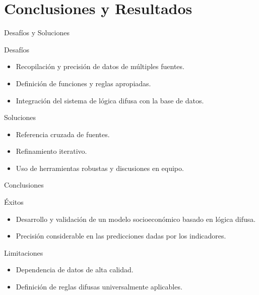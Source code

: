 \documentclass{beamer}
\begin{document}
\section{Conclusiones y Resultados}

\begin{frame}{Desafíos y Soluciones}
    \begin{block}{Desafíos}
        \begin{itemize}
            \item Recopilación y precisión de datos de múltiples fuentes.
            \item Definición de funciones y reglas apropiadas.
            \item Integración del sistema de lógica difusa con la base de datos.
        \end{itemize}
    \end{block}
    \begin{block}{Soluciones}
        \begin{itemize}
            \item Referencia cruzada de fuentes.
            \item Refinamiento iterativo.
            \item Uso de herramientas robustas y discusiones en equipo.
        \end{itemize}
    \end{block}
\end{frame}

\begin{frame}{Conclusiones}
    \begin{block}{Éxitos}
        \begin{itemize}
            \item Desarrollo y validación de un modelo socioeconómico basado en lógica difusa.
            \item Precisión considerable en las predicciones dadas por los indicadores.
        \end{itemize}
    \end{block}
    \begin{block}{Limitaciones}
        \begin{itemize}
            \item Dependencia de datos de alta calidad.
            \item Definición de reglas difusas universalmente aplicables.
        \end{itemize}
    \end{block}
\end{frame}
\end{document}
